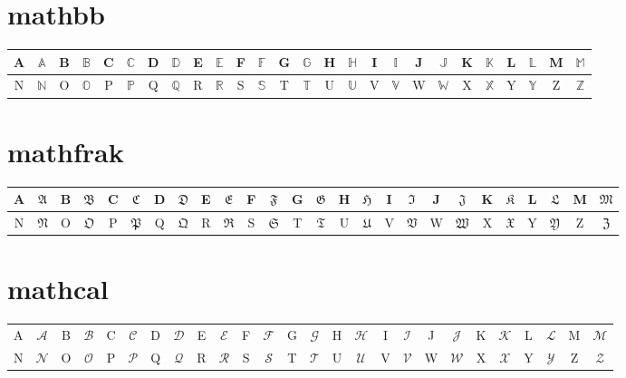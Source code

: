 \documentclass[a4paper,9pt]{scrartcl}
\begin{document}
\section{mathbb}
\begin{tabular}{|c|c||c|c||c|c||c|c||c|c||c|c||c|c||c|c||c|c||c|c||c|c||c|c||c|c|}
    \hline
    A & $\mathbb{A}$ & B & $\mathbb{B}$ & C & $\mathbb{C}$ & D & $\mathbb{D}$ & E & $\mathbb{E}$ & F & $\mathbb{F}$ & G & $\mathbb{G}$ & H & $\mathbb{H}$ & I & $\mathbb{I}$ & J & $\mathbb{J}$ & K & $\mathbb{K}$ & L & $\mathbb{L}$ & M & $\mathbb{M}$\\ 
    \hline
    N & $\mathbb{N}$ & O & $\mathbb{O}$ & P & $\mathbb{P}$ & Q & $\mathbb{Q}$ & R & $\mathbb{R}$ & S & $\mathbb{S}$ & T & $\mathbb{T}$ & U & $\mathbb{U}$ & V & $\mathbb{V}$ & W & $\mathbb{W}$ & X & $\mathbb{X}$ & Y & $\mathbb{Y}$ & Z & $\mathbb{Z}$\\
    \hline
\end{tabular}

\section{mathfrak}
\begin{tabular}{|c|c||c|c||c|c||c|c||c|c||c|c||c|c||c|c||c|c||c|c||c|c||c|c||c|c|}
    \hline
    A & $\mathfrak{A}$ & B & $\mathfrak{B}$ & C & $\mathfrak{C}$ & D & $\mathfrak{D}$ & E & $\mathfrak{E}$ & F & $\mathfrak{F}$ & G & $\mathfrak{G}$ & H & $\mathfrak{H}$ & I & $\mathfrak{I}$ & J & $\mathfrak{J}$ & K & $\mathfrak{K}$ & L & $\mathfrak{L}$ & M & $\mathfrak{M}$\\ 
    \hline
    N & $\mathfrak{N}$ & O & $\mathfrak{O}$ & P & $\mathfrak{P}$ & Q & $\mathfrak{Q}$ & R & $\mathfrak{R}$ & S & $\mathfrak{S}$ & T & $\mathfrak{T}$ & U & $\mathfrak{U}$ & V & $\mathfrak{V}$ & W & $\mathfrak{W}$ & X & $\mathfrak{X}$ & Y & $\mathfrak{Y}$ & Z & $\mathfrak{Z}$\\
    \hline
\end{tabular}

\section{mathcal}
\begin{tabular}{|c|c||c|c||c|c||c|c||c|c||c|c||c|c||c|c||c|c||c|c||c|c||c|c||c|c|}
    \hline
    A & $\mathcal{A}$ & B & $\mathcal{B}$ & C & $\mathcal{C}$ & D & $\mathcal{D}$ & E & $\mathcal{E}$ & F & $\mathcal{F}$ & G & $\mathcal{G}$ & H & $\mathcal{H}$ & I & $\mathcal{I}$ & J & $\mathcal{J}$ & K & $\mathcal{K}$ & L & $\mathcal{L}$ & M & $\mathcal{M}$\\ 
    N & $\mathcal{N}$ & O & $\mathcal{O}$ & P & $\mathcal{P}$ & Q & $\mathcal{Q}$ & R & $\mathcal{R}$ & S & $\mathcal{S}$ & T & $\mathcal{T}$ & U & $\mathcal{U}$ & V & $\mathcal{V}$ & W & $\mathcal{W}$ & X & $\mathcal{X}$ & Y & $\mathcal{Y}$ & Z & $\mathcal{Z}$\\
    \hline
\end{tabular}
\end{document}

